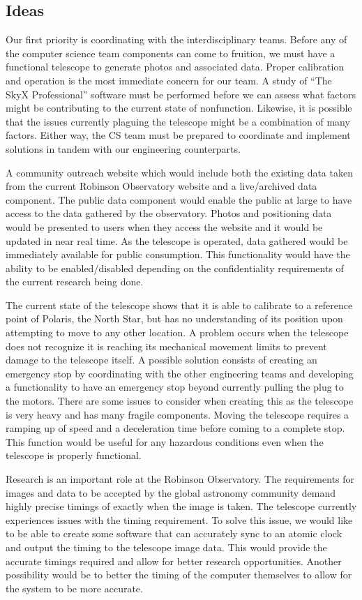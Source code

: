 \documentclass[12pt]{article}
\begin{document}
\subsection{Ideas}

Our first priority is coordinating with the interdisciplinary teams. Before any of the computer science team components can come to fruition, we must have a functional telescope to generate photos and associated data. Proper calibration and operation is the most immediate concern for our team. A study of “The SkyX Professional” software must be performed before we can assess what factors might be contributing to the current state of nonfunction. Likewise, it is possible that the issues currently plaguing the telescope might be a combination of many factors. Either way, the CS team must be prepared to coordinate and implement solutions in tandem with our engineering counterparts.

A community outreach website which would include both the existing data taken from the current Robinson Observatory website and a live/archived data component. The public data component would enable the public at large to have access to the data gathered by the observatory. Photos and positioning data would be presented to users when they access the website and it would be updated in near real time. As the telescope is operated, data gathered would be immediately available for public consumption. This functionality would have the ability to be enabled/disabled depending on the confidentiality requirements of the current research being done.

The current state of the telescope shows that it is able to calibrate to a reference point of Polaris, the North Star, but has no understanding of its position upon attempting to move to any other location.  A problem occurs when the telescope does not recognize it is reaching its mechanical movement limits to prevent damage to the telescope itself.  A possible solution consists of creating an emergency stop by coordinating with the other engineering teams and developing a functionality to have an emergency stop beyond currently pulling the plug to the motors.  There are some issues to consider when creating this as the telescope is very heavy and has many fragile components.  Moving the telescope requires a ramping up of speed and a deceleration time before coming to a complete stop.  This function would be useful for any hazardous conditions even when the telescope is properly functional.

Research is an important role at the Robinson Observatory.  The requirements for images and data to be accepted by the global astronomy community demand highly precise timings of exactly when the image is taken.  The telescope currently experiences issues with the timing requirement.  To solve this issue, we would like to be able to create some software that can accurately sync to an atomic clock and output the timing to the telescope image data.  This would provide the accurate timings required and allow for better research opportunities.  Another possibility would be to better the timing of the computer themselves to allow for the system to be more accurate.
\end{document}
